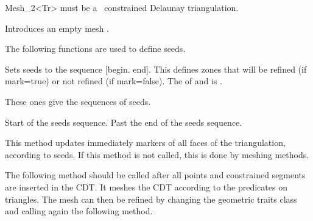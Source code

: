 \begin{ccRefClass}{Mesh_2<Tr>}
 must be a \cgal\ constrained Delaunay triangulation.

\ccTypes 
{}

\ccCreation
{}

{Introduces an empty mesh \ccVar.}



The following functions are used to define seeds.


{ Sets seeds to the sequence [begin. end]. This defines zones that
  will be refined (if mark=true) or not refined (if
  mark=false).
  \ccPrecond The  of  and 
  is .}

These ones give the sequences of seeds.

{ Start of the seeds sequence. }
\ccGlue
{}
{ Past the end of the seeds sequence. }

{ This method updates immediately markers of all faces of the
  triangulation, according to seeds. If this method is not called,
  this is done by meshing methods. }


The following method should be called after all points and constrained 
segments are inserted in the CDT. It meshes the CDT according to the
 predicates on triangles.  The mesh can then be refined by
changing the geometric traits class and calling again the following
method.


\end{ccRefClass}
